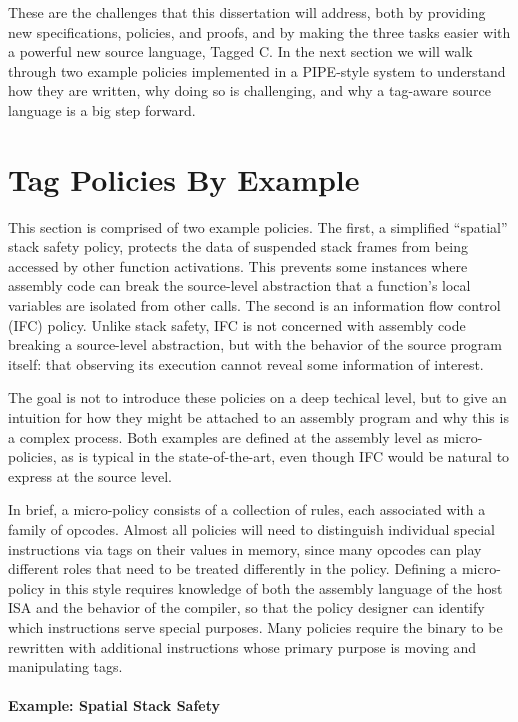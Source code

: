 \documentclass{report}
\begin{document}
These are the challenges that this dissertation will address, both by 
providing new specifications, policies, and proofs, and by making the three tasks
easier with a powerful new source language, Tagged C.
In the next section we will walk through two example policies implemented in a PIPE-style
system to understand how they are written, why doing so is challenging,
and why a tag-aware source language is a big step forward.

\section{Tag Policies By Example}

This section is comprised of two example policies. The first, a simplified ``spatial''
stack safety policy, protects the data of suspended stack frames from being accessed by
other function activations. This prevents some instances where assembly
code can break the source-level abstraction that a function's local variables are isolated
from other calls. The second is an information flow control (IFC) policy. Unlike stack safety,
IFC is not concerned with assembly code breaking a source-level abstraction, but with
the behavior of the source program itself: that observing its execution cannot reveal
some information of interest.

The goal is not to introduce these policies on a deep techical level, but to give an
intuition for how they might be attached to an assembly program and why this is a complex
process. Both examples are defined at the assembly level as micro-policies,
as is typical in the state-of-the-art, even though IFC would be natural to express at the
source level.

In brief, a micro-policy consists of a collection of rules, each associated with a family
of opcodes. Almost all policies will need to distinguish individual special instructions
via tags on their values in memory, since many opcodes can play different roles that need to be
treated differently in the policy. Defining a micro-policy in this style requires knowledge
of both the assembly language of the host ISA and the behavior of the compiler, so that the
policy designer can identify which instructions serve special purposes. Many policies require
the binary to be rewritten with additional instructions whose primary purpose is moving and
manipulating tags.

\paragraph{Example: Spatial Stack Safety}
\end{document}
